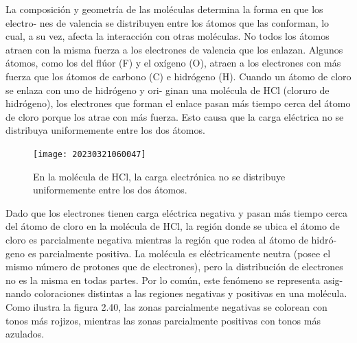 \documentclass[12pt,addpoints,answers]{guia}
\begin{document}

\begin{tcolorbox}[enhanced,attach boxed title to top center={yshift=-3mm,yshifttext=-1mm},
        colback=blue!5!white,colframe=blue!75!black,colbacktitle=red!80!black,
        title=Distribución de carga,fonttitle=\bfseries,
        boxed title style={size=small,colframe=red!50!black} ]
    La composición y geometría de las moléculas determina la forma en que los electro-
    nes de valencia se distribuyen entre los átomos que las conforman, lo cual, a su vez,
    afecta la interacción con otras moléculas. No todos los átomos atraen con la misma
    fuerza a los electrones de valencia que los enlazan. Algunos átomos, como los del flúor
    (F) y el oxígeno (O), atraen a los electrones con más fuerza que los átomos de carbono
    (C) e hidrógeno (H). Cuando un átomo de cloro se enlaza con uno de hidrógeno y ori-
    ginan una molécula de HCl (cloruro de hidrógeno), los electrones que forman el enlace
    pasan más tiempo cerca del átomo de cloro porque los atrae con más fuerza. Esto
    causa que la carga eléctrica no se distribuya uniformemente entre los dos átomos.
    \begin{figure}[H]
        \texttt{[image: 20230321060047]}
        \caption{En la
            molécula de HCl, la
            carga electrónica
            no se distribuye
            uniformemente entre
            los dos átomos.}
        \label{fig:20230321060047}
    \end{figure}
    Dado que los electrones tienen carga eléctrica negativa y pasan más tiempo cerca
    del átomo de cloro en la molécula de HCl, la región donde se ubica el átomo de
    cloro es parcialmente negativa mientras la región que rodea al átomo de hidró-
    geno es parcialmente positiva. La molécula es eléctricamente neutra (posee el
    mismo número de protones que de electrones), pero la distribución de electrones
    no es la misma en todas partes. Por lo común, este fenómeno se representa asig-
    nando coloraciones distintas a las regiones negativas y positivas en una molécula.
    Como ilustra la figura 2.40, las zonas parcialmente negativas se colorean con tonos
    más rojizos, mientras las zonas parcialmente positivas con tonos más azulados.
\end{tcolorbox}
\end{document}

